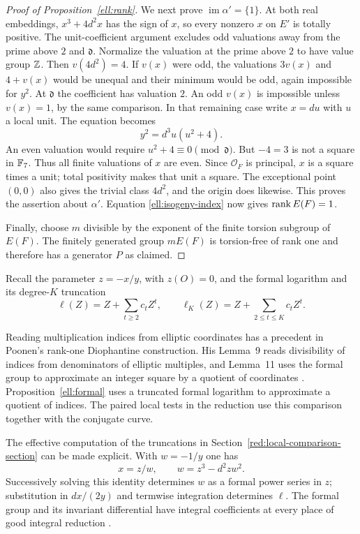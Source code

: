 \begin{proof}[Proof of Proposition~\ref{ell:rank}]
We next prove $\operatorname{im}\alpha'=\{1\}$.  At both real embeddings,
$x^3+4d^2x$ has the sign of $x$, so every nonzero $x$ on $E'$ is totally
positive.  The unit-coefficient argument excludes odd valuations away
from the prime above $2$ and $\mathfrak d$.  Normalize the valuation at
the prime above $2$ to have value group $\mathbb Z$.  Then $v(4d^2)=4$.  If
$v(x)$ were odd, the valuations $3v(x)$ and $4+v(x)$ would be unequal and
their minimum would be odd, again impossible for $y^2$.
At $\mathfrak d$ the coefficient has valuation $2$.  An odd $v(x)$ is
impossible unless $v(x)=1$, by the same comparison.  In that remaining
case write $x=du$ with $u$ a local unit.  The equation becomes
\[
                         y^2=d^3u(u^2+4).
\]
An even valuation would require $u^2+4\equiv0\pmod{\mathfrak d}$.
But $-4=3$ is not a square in $\mathbb F_7$.  Thus all finite valuations of $x$
are even.  Since $\mathcal O_F$ is principal, $x$ is a square times a
unit; total positivity makes that unit a square.  The exceptional point
$(0,0)$ also gives the trivial class $4d^2$, and the origin does likewise.
This proves the assertion about $\alpha'$.  Equation
\eqref{ell:isogeny-index} now gives $\operatorname{rank} E(F)=1$.

Finally, choose $m$ divisible by the exponent of the finite torsion
subgroup of $E(F)$.  The finitely generated group $mE(F)$ is torsion-free
of rank one and therefore has a generator $P$ as claimed.
\end{proof}

Recall the parameter \(z=-x/y\), with \(z(O)=0\), and the formal
logarithm and its degree-\(K\) truncation
\[
 \ell(Z)=Z+\sum_{t\ge2}c_tZ^t,\qquad
 \ell_K(Z)=Z+\sum_{2\le t\le K}c_tZ^t.
\]

Reading multiplication indices from elliptic coordinates has a
precedent in Poonen's rank-one Diophantine construction.  His
Lemma~9 reads divisibility of indices from denominators of elliptic
multiples, and Lemma~11 uses the formal group to approximate an
integer square by a quotient of coordinates
\cite{PoonenRankOne2002}.  Proposition~\ref{ell:formal} uses a
truncated formal logarithm to approximate a quotient of indices.
The paired local tests in the reduction use this comparison together with the
conjugate curve.

The effective computation of the truncations in Section~\ref{red:local-comparison-section} can be made explicit.  With $w=-1/y$ one has
\[
              x=z/w,\qquad w=z^3-d^2zw^2.
\]
Successively solving this identity determines $w$ as a formal power
series in $z$; substitution in $dx/(2y)$ and termwise integration
determines $\ell$.  The formal group and its invariant differential have
integral coefficients at every place of good integral reduction
\cite[Chapter IV]{Silverman2009}.

